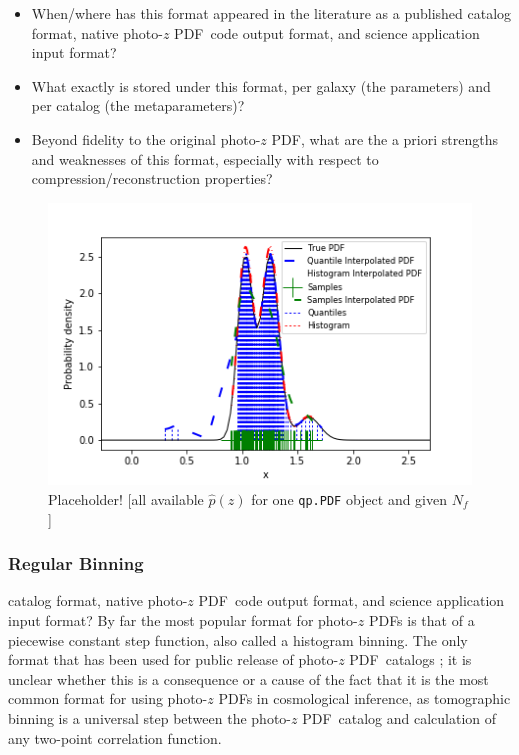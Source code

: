 \documentclass[\docopts]{\docclass}
\newcommand{\pz}{photo-$z$ PDF}
\begin{document}
\begin{itemize}
  \item When/where has this format appeared in the literature as a published 
catalog format, native \pz\ code output format, and science application input 
format?
  \item What exactly is stored under this format, per galaxy (the parameters) 
and per catalog (the metaparameters)?
  \item Beyond fidelity to the original \pz, what are the a priori strengths 
and weaknesses of this format, especially with respect to 
compression/reconstruction properties?
\end{itemize}

\begin{figure}
  \includegraphics[width=0.9\columnwidth]{figures/qp_placeholder.png}
  \caption{Placeholder! [all available $\hat{p}(z)$ for one \texttt{qp.PDF} 
object and given $N_{f}$]  
  \label{fig:qp}}
\end{figure}

\subsubsection{Regular Binning}
\label{sec:bins}

catalog format, native \pz\ code output format, and science application input 
format?
By far the most popular format for \pz s is that of a piecewise constant step 
function, also called a histogram binning.  The only format that has been used 
for public release of \pz\ catalogs \citep{tanaka_photometric_2017, 
sheldon_photometric_2012}; it is unclear whether this is a consequence or a 
cause of the fact that it is the most common format for using \pz s in 
cosmological inference, as tomographic binning is a universal step between the 
\pz\ catalog and calculation of any two-point correlation function.  
\end{document}
